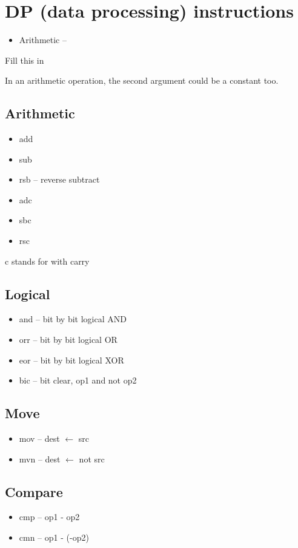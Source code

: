 \documentclass{scrartcl}
\begin{document}
\section{DP (data processing) instructions}
\begin{itemize}
	\item Arithmetic -- 
\end{itemize}
Fill this in

In an arithmetic operation, the second argument could be a constant too.
\subsection{Arithmetic}
\begin{itemize}
	\item add
	\item  sub
	\item rsb -- reverse subtract
	\item adc
	\item sbc
	\item rsc
\end{itemize}
c stands for with carry

\subsection{Logical}
\begin{itemize}
	\item and -- bit by bit logical AND
	\item orr -- bit by bit logical OR
	\item eor -- bit by bit logical XOR
	\item bic -- bit clear, op1 and not op2
\end{itemize}

\subsection{Move}
\begin{itemize}
	\item mov -- dest $\leftarrow$ src
	\item mvn -- dest $\leftarrow$ not src
\end{itemize}

\subsection{Compare}
\begin{itemize}
	\item cmp -- op1 - op2
	\item cmn -- op1 - (-op2)
\end{itemize}
\end{document}
